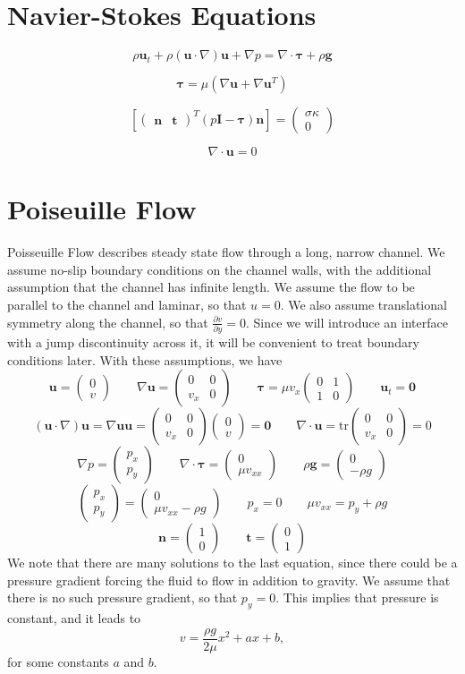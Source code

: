 \documentclass{article}
\newcommand{\q}{\quad\quad}
\newcommand{\z}{\mathbf{0}}
\newcommand{\tr}{\mbox{tr}}
\newcommand{\uu}{\mathbf{u}}
\newcommand{\II}{\mathbf{I}}
\renewcommand{\gg}{\mathbf{g}}
\renewcommand{\uu}{\mathbf{u}}
\newcommand{\nn}{\mathbf{n}}
\renewcommand{\tt}{\mathbf{t}}
\newcommand{\ta}{\pmb{\tau}}
\newcommand{\mx}[1]{\begin{pmatrix} #1 \end{pmatrix}}
\newcommand{\px}[2]{\frac{\partial #1}{\partial #2}}
\begin{document}
\section{Navier-Stokes Equations}

$$ \rho \uu_t + \rho (\uu \cdot \nabla) \uu + \nabla p = \nabla\cdot \ta + \rho \gg $$

$$ \ta = \mu (\nabla \uu + \nabla \uu^T) $$

$$ \left[ \mx{\nn & \tt}^T (p \II - \ta) \nn \right] = \mx{\sigma \kappa \\ 0} $$

$$ \nabla \cdot \uu = 0 $$

\section{Poiseuille Flow}

Poisseuille Flow describes steady state flow through a long, narrow channel.  We assume no-slip boundary conditions on the channel walls, with the additional assumption that the channel
has infinite length. We assume the flow to be parallel to the channel and laminar, so that $u = 0$.  We also assume translational symmetry along the channel, so that $\px{v}{y}=0$.
Since we will introduce an interface with a jump discontinuity across it, it will be convenient to treat boundary conditions later.  With these assumptions, we have
$$ \uu = \mx{0 \\ v} \q \nabla\uu = \mx{0 & 0 \\ v_x & 0} \q \ta = \mu v_x \mx{0 & 1 \\ 1 & 0} \q \uu_t = \z$$
$$ (\uu \cdot \nabla) \uu = \nabla\uu \uu = \mx{0 & 0 \\ v_x & 0} \mx{0 \\ v} = \z \q \nabla \cdot \uu = \tr\mx{0 & 0 \\ v_x & 0} = 0 $$
$$ \nabla p = \mx{p_x \\ p_y} \q \nabla\cdot \ta = \mx{0 \\ \mu v_{xx}} \q \rho \gg = \mx{0 \\ -\rho g} $$
$$ \mx{p_x \\ p_y} = \mx{0 \\ \mu v_{xx} - \rho g} \q p_x = 0 \q \mu v_{xx} = p_y + \rho g $$
$$ \nn = \mx{1 \\ 0} \q \tt = \mx{0 \\ 1} $$
We note that there are many solutions to the last equation, since there could be a pressure gradient forcing the fluid to flow in addition to gravity.  We assume that there is no such
pressure gradient, so that $p_y = 0$.  This implies that pressure is constant, and it leads to
$$ v = \frac{\rho g}{2 \mu} x^2 + a x + b, $$
for some constants $a$ and $b$.
\end{document}
